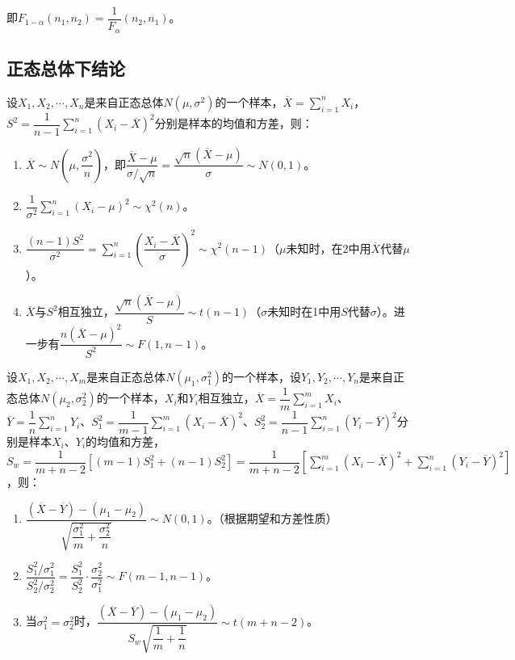即$F_{1-\alpha}(n_1,n_2)=\dfrac{1}{F_\alpha}(n_2,n_1)$。

\subsection{正态总体下结论}

设$X_1,X_2,\cdots,X_n$是来自正态总体$N(\mu,\sigma^2)$的一个样本，$\overline{X}=\sum\limits_{i=1}^nX_i$，$S^2=\dfrac{1}{n-1}\sum\limits_{i=1}^n(X_i-\overline{X})^2$分别是样本的均值和方差，则：

\begin{enumerate}
    \item $\overline{X}\sim N\left(\mu,\dfrac{\sigma^2}{n}\right)$，即$\dfrac{\overline{X}-\mu}{\sigma/\sqrt{n}}=\dfrac{\sqrt{n}(\overline{X}-\mu)}{\sigma}\sim N(0,1)$。
    \item $\dfrac{1}{\sigma^2}\sum\limits_{i=1}^n(X_i-\mu)^2\sim\chi^2(n)$。
    \item $\dfrac{(n-1)S^2}{\sigma^2}=\sum\limits_{i=1}^n\left(\dfrac{X_i-\overline{X}}{\sigma}\right)^2\sim\chi^2(n-1)$（$\mu$未知时，在2中用$\overline{X}$代替$\mu$）。
    \item $\overline{X}$与$S^2$相互独立，$\dfrac{\sqrt{n}(\overline{X}-\mu)}{S}\sim t(n-1)$（$\sigma$未知时在1中用$S$代替$\sigma$）。进一步有$\dfrac{n(\overline{X}-\mu)^2}{S^2}\sim F(1,n-1)$。
\end{enumerate}

设$X_1,X_2,\cdots,X_m$是来自正态总体$N(\mu_1,\sigma_1^2)$的一个样本，设$Y_1,Y_2,\cdots,Y_n$是来自正态总体$N(\mu_2,\sigma_2^2)$的一个样本，$X_i$和$Y_i$相互独立，$\overline{X}=\dfrac{1}{m}\sum\limits_{i=1}^mX_i$、$\overline{Y}=\dfrac{1}{n}\sum\limits_{i=1}^nY_i$、$S_1^2=\dfrac{1}{m-1}\sum\limits_{i=1}^m(X_i-\overline{X})^2$、$S_2^2=\dfrac{1}{n-1}\sum\limits_{i=1}^n(Y_i-\overline{Y})^2$分别是样本$X_i$、$Y_i$的均值和方差，$S_w=\dfrac{1}{m+n-2}[(m-1)S_1^2+(n-1)S_2^2]=\dfrac{1}{m+n-2}[\sum\limits_{i=1}^m(X_i-\overline{X})^2+\sum\limits_{i=1}^n(Y_i-\overline{Y})^2]$，则：

\begin{enumerate}
    \item $\dfrac{(\overline{X}-\overline{Y})-(\mu_1-\mu_2)}{\sqrt{\dfrac{\sigma_1^2}{m}+\dfrac{\sigma_2^2}{n}}}\sim N(0,1)$。（根据期望和方差性质）
    \item $\dfrac{S_1^2/\sigma_1^2}{S_2^2/\sigma_2^2}=\dfrac{S_1^2}{S_2^2}\cdot\dfrac{\sigma_2^2}{\sigma_1^2}\sim F(m-1,n-1)$。
    \item 当$\sigma_1^2=\sigma_2^2$时，$\dfrac{(\overline{X}-\overline{Y})-(\mu_1-\mu_2)}{S_w\sqrt{\dfrac{1}{m}+\dfrac{1}{n}}}\sim t(m+n-2)$。
\end{enumerate}

